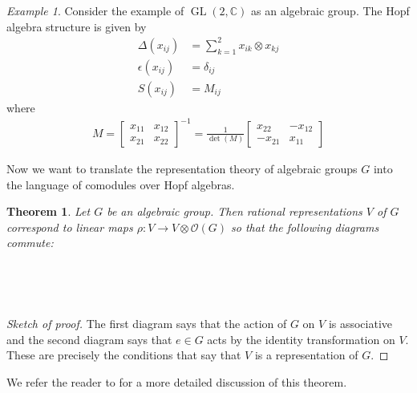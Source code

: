 \documentclass[manuscript, printscheme]{aomart}
\theoremstyle{plain} %
\newtheorem{theorem}[equation]{Theorem}
\theoremstyle{definition}
\theoremstyle{remark}
\newtheorem{example}[equation]{Example}
\DeclareMathOperator{\id}{id}
\DeclareMathOperator{\GL}{GL}
\newcommand{\C}{\mathbb{C}}
\newcommand{\mc}[1]{\mathcal{#1}}
\begin{document}
\begin{example}
	Consider the example of $\GL(2,\C)$ as an algebraic group. The Hopf algebra structure is given by
	\begin{align*}
		\Delta(x_{ij})   & = \sum_{k=1}^2 x_{ik}\otimes x_{kj} \\
		\epsilon(x_{ij}) & = \delta_{ij}                       \\
		S(x_{ij})        & = M_{ij}
	\end{align*} where \begin{align*}
		M = \begin{bmatrix}
			    x_{11} & x_{12} \\
			    x_{21} & x_{22}
		    \end{bmatrix}^{-1} = \frac{1}{\det(M)}\begin{bmatrix}
			                                          x_{22}  & -x_{12} \\
			                                          -x_{21} & x_{11}
		                                          \end{bmatrix}
	\end{align*}
\end{example}

\hfill

Now we want to translate the representation theory of algebraic groups $G$
into the language of comodules over Hopf algebras.
\begin{theorem}
	Let $G$ be an algebraic group. Then rational representations $V$ of $G$
	correspond to linear maps $\rho: V\to V\otimes \mc O(G)$ so that the following diagrams commute:
	\begin{center}
		 \\
		\vspace{5mm}
		 \\
	\end{center}
\end{theorem}
\begin{proof}
	[Sketch of proof] The first diagram says that the action of $G$ on $V$ is associative
	and the second diagram says that $e\in G$ acts by the identity transformation on $V$.
	These are precisely the conditions that say that $V$ is a representation of $G$.
\end{proof}
We refer the reader to \cite{waterhouse} for a more detailed discussion of this theorem.
\end{document}
